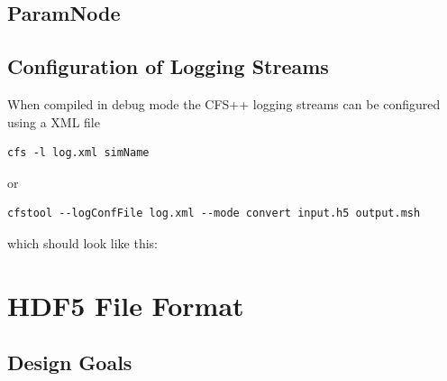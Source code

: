 \subsection{ParamNode}
\subsection{Configuration of Logging Streams}

When compiled in debug mode the  CFS++ logging streams can be configured using
a XML file

\begin{verbatim}
cfs -l log.xml simName
\end{verbatim}

\noindent or

\begin{verbatim}
cfstool --logConfFile log.xml --mode convert input.h5 output.msh
\end{verbatim}

\noindent which should look like this:



\section{HDF5 File Format}

\subsection{Design Goals}

